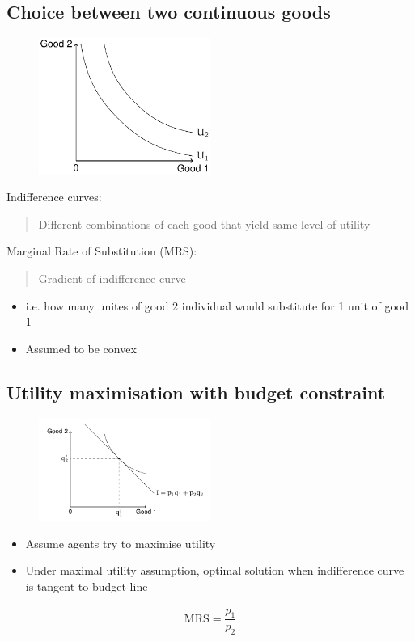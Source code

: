 \documentclass[class=report, crop=false, 12pt,a4paper]{standalone}
\begin{document}
\subsection{Choice between two continuous goods}
\begin{figure}[H]
	\centering
	\includegraphics[width = 0.5\textwidth]{../img/figure4.png}
	\caption{}
\end{figure}
Indifference curves:
\begin{quote}
	Different combinations of each good that yield same level of utility
\end{quote}
Marginal Rate of Substitution (MRS):
\begin{quote}
	Gradient of indifference curve
\end{quote}
\begin{itemize}
	\item i.e. how many unites of good 2 individual would substitute for 1 unit of good 1
	\item Assumed to be convex
\end{itemize}
\subsection{Utility maximisation with budget constraint}
\begin{figure}[H]
	\centering
	\includegraphics[width = 0.5\textwidth]{../img/figure5.png}
	\caption{}
\end{figure}
\begin{itemize}
	\item Assume agents try to maximise utility
	\item Under maximal utility assumption, optimal solution when indifference curve is tangent to budget line
\end{itemize}
\begin{gather}
	\textrm{MRS} = \dfrac{p_1}{p_2}
\end{gather}
\end{document}
